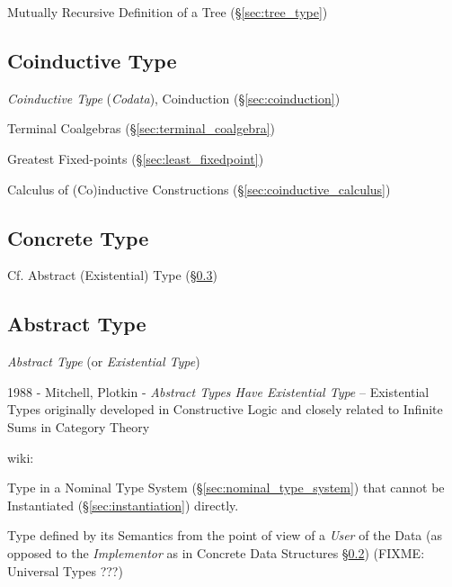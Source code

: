 Mutually Recursive Definition of a Tree (\S\ref{sec:tree_type})



\subsection{Coinductive Type}\label{sec:coinductive_type}

\emph{Coinductive Type} (\emph{Codata}), Coinduction (\S\ref{sec:coinduction})

Terminal Coalgebras (\S\ref{sec:terminal_coalgebra})

Greatest Fixed-points (\S\ref{sec:least_fixedpoint})

Calculus of (Co)inductive Constructions (\S\ref{sec:coinductive_calculus})



\subsection{Concrete Type}\label{sec:concrete_type}

\fist Cf. Abstract (Existential) Type (\S\ref{sec:abstract_type})



\subsection{Abstract Type}\label{sec:abstract_type}

\emph{Abstract Type} (or \emph{Existential Type})

1988 - Mitchell, Plotkin - \emph{Abstract Types Have Existential Type} --
Existential Types originally developed in Constructive Logic and closely
related to Infinite Sums in Category Theory

wiki:

Type in a Nominal Type System (\S\ref{sec:nominal_type_system}) that
cannot be Instantiated (\S\ref{sec:instantiation}) directly.

Type defined by its Semantics from the point of view of a
\emph{User} of the Data (as opposed to the \emph{Implementor} as in
Concrete Data Structures \S\ref{sec:concrete_type}) (FIXME: Universal Types ???)


